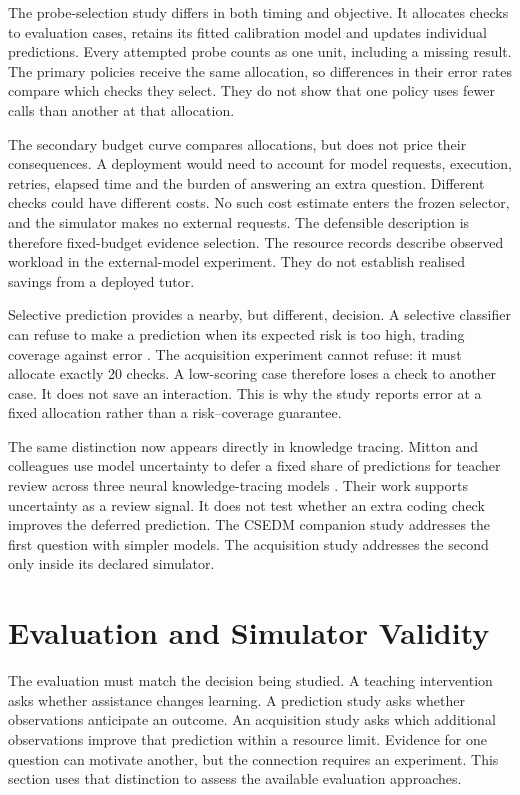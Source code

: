 The probe-selection study differs in both timing and objective. It allocates checks to evaluation cases, retains its fitted calibration model and
updates individual predictions. Every attempted probe counts as one unit, including a missing result. The primary policies
receive the same allocation, so differences in their error rates compare which checks they select. They do not show that
one policy uses fewer calls than another at that allocation.

The secondary budget curve compares allocations, but does not price their consequences. A deployment would need to account
for model requests, execution, retries, elapsed time and the burden of answering an extra question. Different checks could
have different costs. No such cost estimate enters the frozen selector, and the simulator makes no external requests.
The defensible description is therefore fixed-budget evidence selection. The resource records describe observed workload
in the external-model experiment. They do not establish realised savings from a deployed tutor.

Selective prediction provides a nearby, but different, decision. A selective classifier can refuse to make a prediction when
its expected risk is too high, trading coverage against error \parencite{geifman2017selective}. The acquisition experiment
cannot refuse: it must allocate exactly 20 checks. A low-scoring case therefore loses a check to another case. It does not
save an interaction. This is why the study reports error at a fixed allocation rather than a risk--coverage guarantee.

The same distinction now appears directly in knowledge tracing. Mitton and colleagues use model uncertainty to defer a fixed
share of predictions for teacher review across three neural knowledge-tracing models \parencite{mitton2026defer}. Their work
supports uncertainty as a review signal. It does not test whether an extra coding check improves the deferred prediction. The
CSEDM companion study addresses the first question with simpler models. The acquisition study addresses the second only inside
its declared simulator.

\section{Evaluation and Simulator Validity}

The evaluation must match the decision being studied. A teaching intervention asks whether assistance changes learning.
A prediction study asks whether observations anticipate an outcome. An acquisition study asks which additional observations
improve that prediction within a resource limit. Evidence for one question can motivate another, but the connection requires
an experiment. This section uses that distinction to assess the available evaluation approaches.

